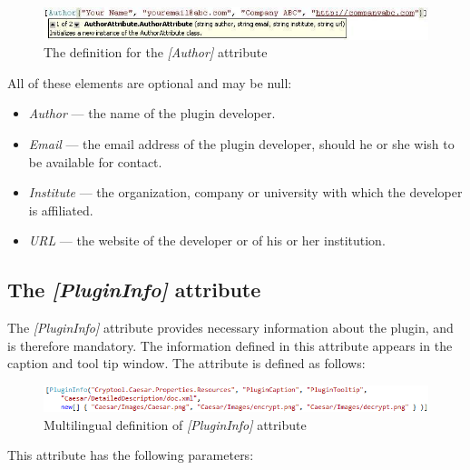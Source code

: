 \begin{figure}[h!]
	\centering
		\includegraphics[width=.90\textwidth]{figures/attribute_author.jpg}
	\caption{The definition for the \textit{[Author]} attribute}
	\label{fig:attribute_author}
\end{figure}

All of these elements are optional and may be null:

\begin{itemize}
	\item \textit{Author} --- the name of the plugin developer.
	\item \textit{Email} --- the email address of the plugin developer, should he or she wish to be available for contact.
	\item \textit{Institute} --- the organization, company or university with which the developer is affiliated.
	\item \textit{URL} --- the website of the developer or of his or her institution.
\end{itemize}

\subsection{The \protect\textit{[PluginInfo]} attribute}
\label{sec:ThePluginInfoAttribute}

The \textit{[PluginInfo]} attribute provides necessary information about the plugin, and is therefore mandatory. The information defined in this attribute appears in the caption and tool tip window. The attribute is defined as follows:

\begin{figure}[h]
	\centering
		\includegraphics[width=1.00\textwidth]{figures/attribute_plugininfo.png}
	\caption{Multilingual definition of \textit{[PluginInfo]} attribute}
	\label{fig:attribute_plugininfo}
\end{figure}

\noindent This attribute has the following parameters:

